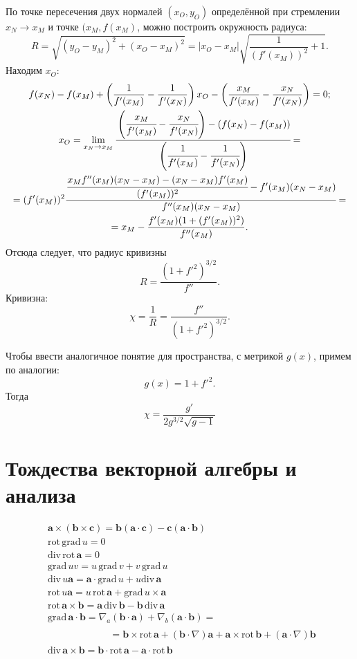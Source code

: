 \documentclass[a4paper,14pt]{extreport} %
\renewcommand{\vec}[1]{\bm{#1}}
\renewcommand{\div}{\mathrm{div}\,}
\newcommand{\rot}{\mathrm{rot}\,}
\newcommand{\grad}{\mathrm{grad}\,}
\begin{document}
	По точке пересечения двух нормалей $(x_O, y_O)$ определённой при стремлении $x_N \to x_M$ и точке $(x_M, f(x_M)$, можно построить окружность радиуса:
	\[
		R = \sqrt{(y_O - y_M)^2 + (x_O - x_M)^2} = |x_O - x_M| \sqrt{\frac{1}{(f'(x_M))^2} + 1}.
	\]
	Находим $x_O$:
	\begin{equation*}
		\begin{gathered}
			f(x_N) - f(x_M) + \left(\frac{1}{f'(x_M)} - \frac{1}{f'(x_N)} \right) x_O - \left(\frac{x_M}{f'(x_M)} - \frac{x_N}{f'(x_N)} \right) = 0; \\
			x_O = \lim\limits_{x_N \to x_M} 
			\cfrac{\left(\cfrac{x_M}{f'(x_M)} - \cfrac{x_N}{f'(x_N)} \right) - (f(x_N) - f(x_M))}
				  {\left(\cfrac{1}{f'(x_M)} - \cfrac{1}{f'(x_N)} \right)} = \\ =
			(f'(x_M))^2 \cfrac{\cfrac{x_M f''(x_M) (x_N - x_M) - (x_N - x_M) f'(x_M)}{(f'(x_M))^2} - f'(x_M)(x_N - x_M)}
			{f''(x_M) (x_N - x_M)} = \\ =
			x_M - \frac{f'(x_M) (1 + (f'(x_M))^2)}{f''(x_M)}.
		\end{gathered}
	\end{equation*} 
	Отсюда следует, что радиус кривизны
	\[
		R = \frac{(1 + f'^2)^{3/2}}{f''}.
	\]
	Кривизна:
	\[
		\chi = \frac{1}{R} = \frac{f''}{(1 + f'^2)^{3/2}}.
	\]
	
	Чтобы ввести аналогичное понятие для пространства, с метрикой $g(x)$, примем по аналогии:
	\[
		g(x) = 1 + f'^2.
	\]
	Тогда
	\[
		\chi = \frac{g'}{2 g^{3/2}\sqrt{g - 1}}
	\]
	
	\section{Тождества векторной алгебры и анализа}
	
	\begin{align*}
		& \vec{a}\times(\vec{b}\times\vec{c}) = \vec{b} (\vec{a}\cdot\vec{c}) - \vec{c} (\vec{a}\cdot\vec{b})\\
		& \rot \grad u = 0\\
		& \div \rot \vec{a} = 0\\
		& \grad uv = u\, \grad v + v\, \grad u\\
		& \div u \vec{a} = \vec{a} \cdot \grad u + u \div \vec{a}\\
		& \rot u\vec{a} = u\, \rot \vec{a} + \grad u \times \vec{a}\\
		& \rot \vec{a}\times\vec{b} = \vec{a}\, \div \vec{b} - \vec{b}\, \div \vec{a}\\
		&\grad \vec{a} \cdot \vec{b} = \nabla_a(\vec{b}\cdot\vec{a}) + \nabla_b(\vec{a}\cdot\vec{b}) = \\
		&\begin{gathered} 
			\qquad \qquad \qquad = \vec{b}\times\rot \vec{a} + (\vec{b}\cdot\nabla)\vec{a} + \vec{a}\times\rot \vec{b} + (\vec{a}\cdot\nabla)\vec{b}
		\end{gathered} \\
		& \div \vec{a}\times\vec{b} = \vec{b}\cdot \rot \vec{a} - \vec{a}\cdot \rot \vec{b}
	\end{align*}
	
\end{document}
